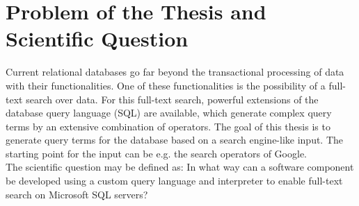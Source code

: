 \section{Problem of the Thesis and Scientific Question}
Current relational databases go far beyond the transactional processing of data with their functionalities. One of these functionalities is the possibility of a full-text search over data. For this full-text search, powerful extensions of the database query language (SQL) are available, which generate complex query terms by an extensive combination of operators. The goal of this thesis is to generate query terms for the database based on a search engine-like input. The starting point for the input can be e.g. the search operators of Google.\\
The scientific question may be defined as: In what way can a software component be developed using a custom query language and interpreter to enable full-text search on Microsoft SQL servers?